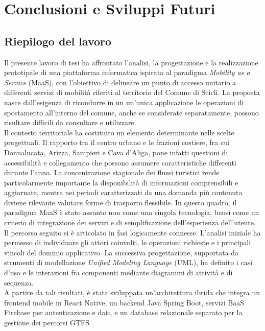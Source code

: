 \chapter{Conclusioni e Sviluppi Futuri}

\section{Riepilogo del lavoro}
Il presente lavoro di tesi ha affrontato l'analisi, la progettazione e la realizzazione prototipale di una piattaforma informatica ispirata al paradigma \emph{Mobility as a Service} (MaaS), con l'obiettivo di delineare un punto di accesso unitario a differenti servizi di mobilità riferiti al territorio del Comune di Scicli. La proposta nasce dall'esigenza di ricondurre in un un'unica applicazione le operazioni di spostamento all'interno del comune, anche se considerate separatamente, possono risultare difficili da consultare e utilizzare.
\\
Il contesto territoriale ha costituito un elemento determinante nelle scelte progettuali. Il rapporto tra il centro urbano e le frazioni costiere, fra cui Donnalucata, Arizza, Sampieri e Cava d'Aliga, pone infatti questioni di accessibilità e collegamento che possono assumere caratteristiche differenti durante l'anno. La concentrazione stagionale dei flussi turistici rende particolarmente importante la disponibilità di informazioni comprensibili e aggiornate, mentre nei periodi caratterizzati da una domanda più contenuta diviene rilevante valutare forme di trasporto flessibile. In questo quadro, il paradigma MaaS è stato assunto non come una singola tecnologia, bensì come un criterio di integrazione dei servizi e di semplificazione dell'esperienza dell'utente.
\\
Il percorso seguito si è articolato in fasi logicamente connesse. L'analisi iniziale ha permesso di individuare gli attori coinvolti, le operazioni richieste e i principali vincoli del dominio applicativo. La successiva progettazione, supportata da strumenti di modellazione \emph{Unified Modeling Language} (UML), ha definito i casi d'uso e le interazioni fra componenti mediante diagrammi di attività e di sequenza. 
\\
A partire da tali risultati, è stata sviluppata un'architettura ibrida che integra un frontend mobile in React Native, un backend Java Spring Boot, servizi BaaS Firebase per autenticazione e dati, e un database relazionale separato per la gestione dei percorsi GTFS

